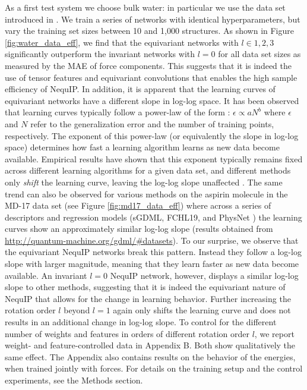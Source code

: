 \documentclass[11pt]{article}
\begin{document}
As a first test system we choose bulk water: in particular we use the data set introduced in \cite{cheng2019ab}. We train a series of networks with identical hyperparameters, but vary the training set sizes between 10 and 1,000 structures. As shown in Figure \ref{fig:water_data_eff}, we find that the equivariant networks with $l \in {1, 2, 3}$ significantly outperform the invariant networks with $l=0$ for all data set sizes as measured by the MAE of force components. This suggests that it is indeed the use of tensor features and equivariant convolutions that enables the high sample efficiency of NequIP. In addition, it is apparent that the learning curves of equivariant networks have a different slope in log-log space. It has been observed that learning curves typically follow a power-law of the form \cite{hestness2017deep}: $\epsilon \propto aN^b$ where $\epsilon$ and $N$ refer to the generalization error and the number of training points, respectively. The exponent of this power-law (or equivalently the slope in log-log space) determines how fast a learning algorithm learns as new data become available. Empirical results have shown that this exponent typically remains fixed across different learning algorithms for a given data set, and different methods only \emph{shift} the learning curve, leaving the log-log slope unaffected \cite{hestness2017deep}. The same trend can also be observed for various methods on the aspirin molecule in the MD-17 data set (see Figure \ref{fig:md17_data_eff}) where across a series of descriptors and regression models (sGDML, FCHL19, and PhysNet \cite{sgdml, christensen2020fchl, physnet_jctc}) the learning curves show an approximately similar log-log slope (results obtained from \url{http://quantum-machine.org/gdml/#datasets}). To our surprise, we observe that the equivariant NequIP networks break this pattern. Instead they follow a log-log slope with larger magnitude, meaning that they learn faster as new data become available. An invariant $l=0$ NequIP network, however, displays a similar log-log slope to other methods, suggesting that it is indeed the equivariant nature of NequIP that allows for the change in learning behavior. Further increasing the rotation order $l$ beyond $l=1$ again only shifts the learning curve and does not results in an additional change in log-log slope. To control for the different number of weights and features in orders of different rotation order $l$, we report weight- and feature-controlled data in Appendix B. Both show qualitatively the same effect. The Appendix also contains results on the behavior of the energies, when trained jointly with forces. For details on the training setup and the control experiments, see the Methods section.\\
\end{document}
